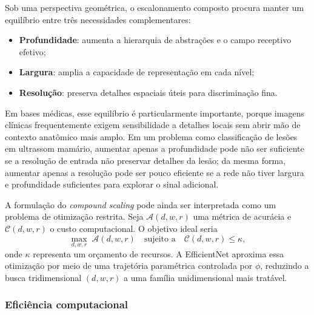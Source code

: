 \documentclass[tcc,capa]{texufpel}
\begin{document}
Sob uma perspectiva geométrica, o escalonamento composto procura manter um equilíbrio entre três necessidades complementares:
\begin{itemize}
	\item \textbf{Profundidade}: aumenta a hierarquia de abstrações e o campo receptivo efetivo;
	\item \textbf{Largura}: amplia a capacidade de representação em cada nível;
	\item \textbf{Resolução}: preserva detalhes espaciais úteis para discriminação fina.
\end{itemize}
Em bases médicas, esse equilíbrio é particularmente importante, porque imagens clínicas frequentemente exigem sensibilidade a detalhes locais sem abrir mão de contexto anatômico mais amplo. Em um problema como classificação de lesões em ultrassom mamário, aumentar apenas a profundidade pode não ser suficiente se a resolução de entrada não preservar detalhes da lesão; da mesma forma, aumentar apenas a resolução pode ser pouco eficiente se a rede não tiver largura e profundidade suficientes para explorar o sinal adicional.

A formulação do \textit{compound scaling} pode ainda ser interpretada como um problema de otimização restrita. Seja \(\mathcal{A}(d,w,r)\) uma métrica de acurácia e \(\mathcal{C}(d,w,r)\) o custo computacional. O objetivo ideal seria
\begin{equation}
	\max_{d,w,r} \; \mathcal{A}(d,w,r)
	\quad \text{sujeito a} \quad
	\mathcal{C}(d,w,r) \leq \kappa,
\end{equation}
onde \(\kappa\) representa um orçamento de recursos. A EfficientNet aproxima essa otimização por meio de uma trajetória paramétrica controlada por \(\phi\), reduzindo a busca tridimensional \((d,w,r)\) a uma família unidimensional mais tratável.

\subsubsection{Eficiência computacional}
\end{document}
